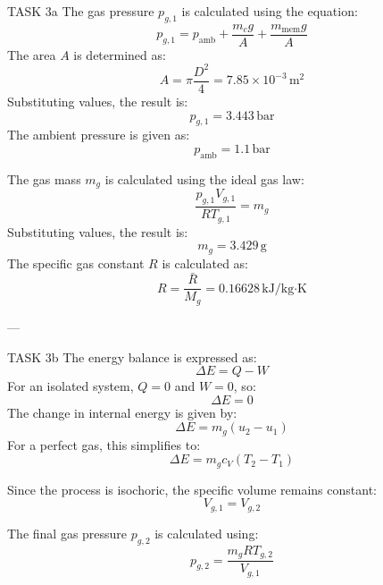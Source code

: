 TASK 3a  
The gas pressure \( p_{g,1} \) is calculated using the equation:  
\[
p_{g,1} = p_{\text{amb}} + \frac{m_c g}{A} + \frac{m_{\text{mem}} g}{A}
\]  
The area \( A \) is determined as:  
\[
A = \pi \frac{D^2}{4} = 7.85 \times 10^{-3} \, \text{m}^2
\]  
Substituting values, the result is:  
\[
p_{g,1} = 3.443 \, \text{bar}
\]  
The ambient pressure is given as:  
\[
p_{\text{amb}} = 1.1 \, \text{bar}
\]  

The gas mass \( m_g \) is calculated using the ideal gas law:  
\[
\frac{p_{g,1} V_{g,1}}{R T_{g,1}} = m_g
\]  
Substituting values, the result is:  
\[
m_g = 3.429 \, \text{g}
\]  
The specific gas constant \( R \) is calculated as:  
\[
R = \frac{\bar{R}}{M_g} = 0.16628 \, \text{kJ/kg·K}
\]  

---

TASK 3b  
The energy balance is expressed as:  
\[
\Delta E = Q - W
\]  
For an isolated system, \( Q = 0 \) and \( W = 0 \), so:  
\[
\Delta E = 0
\]  
The change in internal energy is given by:  
\[
\Delta E = m_g (u_2 - u_1)
\]  
For a perfect gas, this simplifies to:  
\[
\Delta E = m_g c_V (T_2 - T_1)
\]  

Since the process is isochoric, the specific volume remains constant:  
\[
V_{g,1} = V_{g,2}
\]  

The final gas pressure \( p_{g,2} \) is calculated using:  
\[
p_{g,2} = \frac{m_g R T_{g,2}}{V_{g,1}}
\]  

